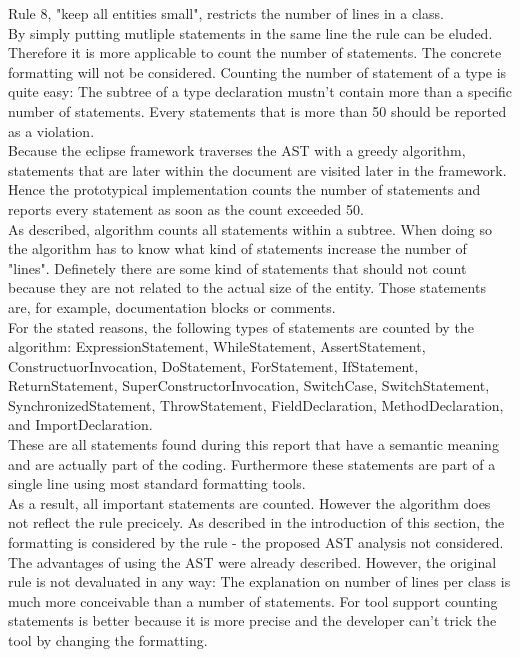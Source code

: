 Rule 8, "keep all entities small", restricts the number of lines in a class.
\\

By simply putting mutliple statements in the same line the rule can be eluded. Therefore it is more applicable to count the number of statements. The concrete formatting will not be considered. Counting the number of statement of a type is quite easy: The subtree of a type declaration mustn't contain more than a specific number of statements. Every statements that is more than 50 should be reported as a violation. 
\\

Because the eclipse framework traverses the \acf{AST} with a greedy algorithm, statements that are later within the document are visited later in the framework. Hence the prototypical implementation counts the number of statements and reports every statement as soon as the count exceeded 50. 
\\

As described, algorithm counts all statements within a subtree. When doing so the algorithm has to know what kind of statements increase the number of "lines". Definetely there are some kind of statements that should not count because they are not related to the actual size of the entity. Those statements are, for example, documentation blocks or comments. 
\\

For the stated reasons, the following types of statements are counted by the algorithm: ExpressionStatement, WhileStatement, AssertStatement, ConstructuorInvocation, DoStatement, ForStatement, IfStatement, ReturnStatement, SuperConstructorInvocation, SwitchCase, SwitchStatement, SynchronizedStatement, ThrowStatement, FieldDeclaration, MethodDeclaration, and ImportDeclaration.
\\

These are all statements found during this report that have a semantic meaning and are actually part of the coding. Furthermore these statements are part of a single line using most standard formatting tools.
\\

As a result, all important statements are counted. However the algorithm does not reflect the rule precicely. As described in the introduction of this section, the formatting is considered by the rule - the proposed \acf{AST} analysis not considered. The advantages of using the \acf{AST} were already described. However, the original rule is not devaluated in any way: The explanation on number of lines per class is much more conceivable than a number of statements. For tool support counting statements is better because it is more precise and the developer can't trick the tool by changing the formatting.
\\

